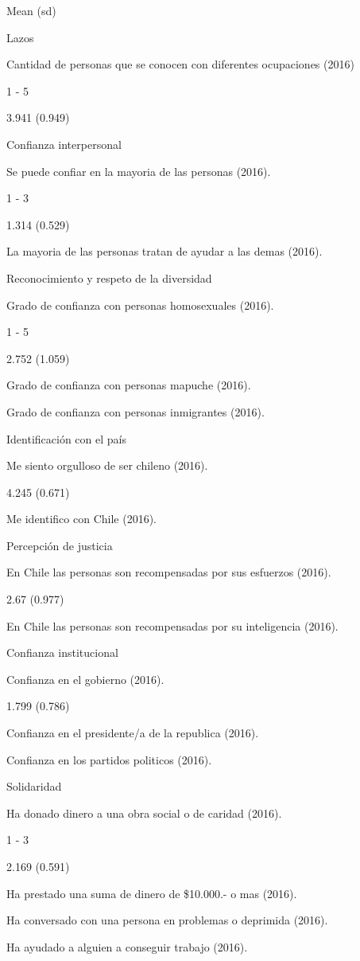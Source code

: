 \documentclass[
  12pt,
]{book}
\begin{document}
Mean (sd)

Lazos

Cantidad de personas que se conocen con diferentes ocupaciones (2016)

1 - 5

3.941 (0.949)

Confianza interpersonal

Se puede confiar en la mayoria de las personas (2016).

1 - 3

1.314 (0.529)

La mayoria de las personas tratan de ayudar a las demas (2016).

Reconocimiento y respeto de la diversidad

Grado de confianza con personas homosexuales (2016).

1 - 5

2.752 (1.059)

Grado de confianza con personas mapuche (2016).

Grado de confianza con personas inmigrantes (2016).

Identificación con el país

Me siento orgulloso de ser chileno (2016).

4.245 (0.671)

Me identifico con Chile (2016).

Percepción de justicia

En Chile las personas son recompensadas por sus esfuerzos (2016).

2.67 (0.977)

En Chile las personas son recompensadas por su inteligencia (2016).

Confianza institucional

Confianza en el gobierno (2016).

1.799 (0.786)

Confianza en el presidente/a de la republica (2016).

Confianza en los partidos politicos (2016).

Solidaridad

Ha donado dinero a una obra social o de caridad (2016).

1 - 3

2.169 (0.591)

Ha prestado una suma de dinero de \$10.000.- o mas (2016).

Ha conversado con una persona en problemas o deprimida (2016).

Ha ayudado a alguien a conseguir trabajo (2016).
\end{document}
